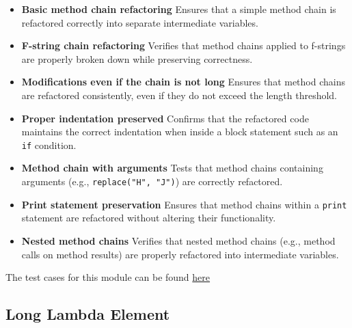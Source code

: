 \documentclass[12pt, titlepage]{article}
\begin{document}
\begin{itemize}
    \item \textbf{Basic method chain refactoring} \newline
    Ensures that a simple method chain is refactored correctly into separate intermediate variables.

    \item \textbf{F-string chain refactoring} \newline
    Verifies that method chains applied to f-strings are properly broken down while preserving correctness.

    \item \textbf{Modifications even if the chain is not long} \newline
    Ensures that method chains are refactored consistently, even if they do not exceed the length threshold.

    \item \textbf{Proper indentation preserved} \newline
    Confirms that the refactored code maintains the correct indentation when inside a block statement such as an \texttt{if} condition.

    \item \textbf{Method chain with arguments} \newline
    Tests that method chains containing arguments (e.g., \texttt{replace("H", "J")}) are correctly refactored.

    \item \textbf{Print statement preservation} \newline
    Ensures that method chains within a \texttt{print} statement are refactored without altering their functionality.

    \item \textbf{Nested method chains} \newline
    Verifies that nested method chains (e.g., method calls on method results) are properly refactored into intermediate variables.
\end{itemize}

\noindent The test cases for this module can be found \href{https://github.com/ssm-lab/capstone--source-code-optimizer/blob/new-poc/tests/refactorers/test_long_element_chain.py}{here}

\subsection{Long Lambda Element}
\end{document}
